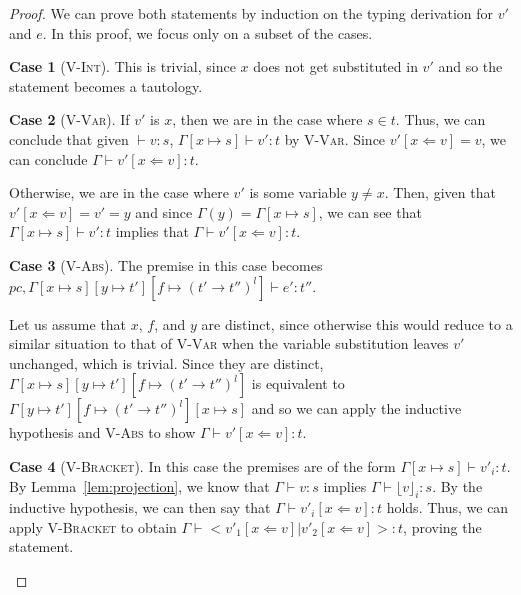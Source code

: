 \documentclass[a4paper,twocolumn]{article}
\newcommand{\typeRule}[3]{#1 \vdash #2 \colon #3}
\newcommand{\lift}[1]{\lfloor #1 \rfloor}
\theoremstyle{plain}
\theoremstyle{definition}
\newtheorem*{case}{Case}
\begin{document}
\begin{proof}
  We can prove both statements by induction on the typing derivation for $v'$
  and $e$.  In this proof, we focus only on a subset of the cases.

  \begin{case}[\textsc{V-Int}]
    This is trivial, since $x$ does not get substituted in $v'$ and so the
    statement becomes a tautology.
  \end{case}

  \begin{case}[\textsc{V-Var}]
    If $v'$ is $x$, then we are in the case where $s \in t$.  Thus, we can
    conclude that given $\typeRule{ }{v}{s}$, $\typeRule{\Gamma[x \mapsto
    s]}{v'}{t}$ by \textsc{V-Var}.  Since $v'[x \Leftarrow v] = v$, we can
    conclude $\typeRule{\Gamma}{v'[x \Leftarrow v]}{t}$.

    Otherwise, we are in the case where $v'$ is some variable $y \neq x$.
    Then, given that $v'[x \Leftarrow v] = v' = y$ and since $\Gamma(y) =
    \Gamma[x \mapsto s]$, we can see that $\typeRule{\Gamma[x \mapsto
    s]}{v'}{t}$ implies that $\typeRule{\Gamma}{v'[x \Leftarrow v]}{t}$.
  \end{case}

  \begin{case}[\textsc{V-Abs}]
    The premise in this case becomes $\typeRule{pc, \Gamma[x \mapsto s][y
    \mapsto t'][f \mapsto (t' \to t'')^l]}{e'}{t''}$.

    Let us assume that $x$, $f$, and $y$ are distinct, since otherwise this
    would reduce to a similar situation to that of \textsc{V-Var} when the
    variable substitution leaves $v'$ unchanged, which is trivial.  Since they
    are distinct, $\Gamma[x \mapsto s][y \mapsto t'][f \mapsto (t' \to t'')^l]$
    is equivalent to $\Gamma[y \mapsto t'][f \mapsto (t' \to t'')^l][x \mapsto
    s]$ and so we can apply the inductive hypothesis and \textsc{V-Abs} to show
    $\typeRule{\Gamma}{v'[x \Leftarrow v]}{t}$.
  \end{case}

  \begin{case}[\textsc{V-Bracket}]
    In this case the premises are of the form $\typeRule{\Gamma[x \mapsto
    s]}{v'_i}{t}$.  By Lemma~\ref{lem:projection}, we know that
    $\typeRule{\Gamma}{v}{s}$ implies $\typeRule{\Gamma}{\lift{v}_i}{s}$.  By
    the inductive hypothesis, we can then say that $\typeRule{\Gamma}{v'_i[x
    \Leftarrow v]}{t}$ holds.  Thus, we can apply \textsc{V-Bracket} to obtain
    $\typeRule{\Gamma}{<v'_1[x \Leftarrow v] | v'_2[x \Leftarrow v]>}{t}$,
    proving the statement.
  \end{case}


\end{proof}
\end{document}
